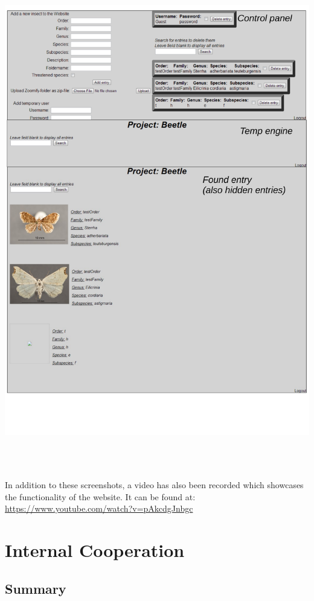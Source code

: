\documentclass[12pt,a4paper]{article}
\begin{document}
\includegraphics[height=225mm]{UI3.pdf}\\
In addition to these screenshots, a video has also been recorded which showcases the functionality of the website. It can be found at: \url{https://www.youtube.com/watch?v=pAkcdgJnbgc}



\newpage

\section{Internal Cooperation}
\subsection{Summary}
\end{document}
